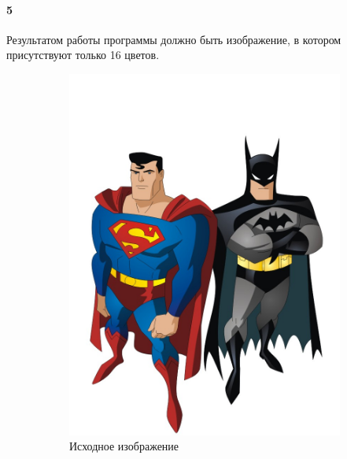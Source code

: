 \documentclass[a4paper,12pt]{article}
\begin{document}
\paragraph{5} Результатом работы программы должно быть изображение, в котором присутствуют только 16 цветов.


\begin{figure}[htbp]
        \centering
        \begin{subfigure}[b]{0.45\textwidth}
                \includegraphics[width=\textwidth]{images/superman-batman}
                \caption{Исходное изображение}
        \end{subfigure}%
        ~ 
        \begin{subfigure}[b]{0.45\textwidth}

\end{subfigure}
\end{figure}
\end{document}
